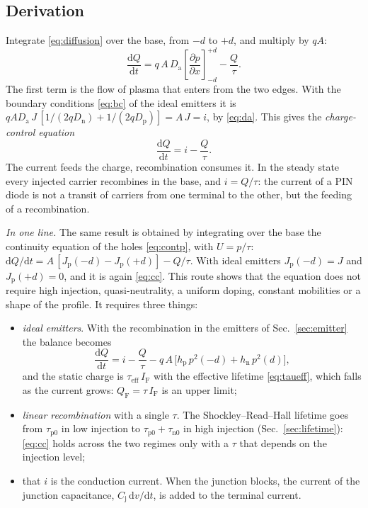 \documentclass[10pt,a4paper]{scrartcl}
\newcommand{\IF}{I_\mathrm{F}}
\newcommand{\Cj}{C_\mathrm{j}}
\newcommand{\diff}{\mathrm{d}}
\newcommand{\Da}{D_\mathrm{a}}
\newcommand{\Dn}{D_\mathrm{n}}
\newcommand{\Dp}{D_\mathrm{p}}
\newcommand{\Jp}{J_\mathrm{p}}
\newcommand{\QF}{Q_\mathrm{F}}
\newcommand{\dpar}[2]{\frac{\partial #1}{\partial #2}}
\begin{document}
\subsection{Derivation}
\label{sec:ccderiv}
Integrate \eqref{eq:diffusion} over the base, from $-d$ to $+d$, and multiply by $qA$:
\begin{equation}
\frac{\diff Q}{\diff t} = q\,A\,\Da\left[\dpar{p}{x}\right]_{-d}^{+d} - \frac{Q}{\tau} .
\label{eq:integrated}
\end{equation}
The first term is the flow of plasma that enters from the two edges. With the boundary conditions \eqref{eq:bc} of the ideal emitters it is $q A \Da\,J\,[1/(2q\Dn) + 1/(2q\Dp)] = A\,J = i$, by \eqref{eq:da}. This gives the \emph{charge-control equation}
\begin{equation}
\frac{\diff Q}{\diff t} = i - \frac{Q}{\tau} .
\label{eq:cc}
\end{equation}
The current feeds the charge, recombination consumes it. In the steady state every injected carrier recombines in the base, and $i = Q/\tau$: the current of a PIN diode is not a transit of carriers from one terminal to the other, but the feeding of a recombination.

\emph{In one line.} The same result is obtained by integrating over the base the continuity equation of the holes \eqref{eq:contp}, with $U = p/\tau$: $\diff Q/\diff t = A\,[\Jp(-d) - \Jp(+d)] - Q/\tau$. With ideal emitters $\Jp(-d) = J$ and $\Jp(+d) = 0$, and it is again \eqref{eq:cc}. This route shows that the equation does not require high injection, quasi-neutrality, a uniform doping, constant mobilities or a shape of the profile. It requires three things:
\begin{itemize}
\item \emph{ideal emitters}. With the recombination in the emitters of Sec.~\ref{sec:emitter} the balance becomes
\begin{equation}
\frac{\diff Q}{\diff t} = i - \frac{Q}{\tau} - q\,A\,\bigl[h_\mathrm{p}\,p^2(-d) + h_\mathrm{n}\,p^2(d)\bigr] ,
\label{eq:ccem}
\end{equation}
and the static charge is $\tau_\mathrm{eff}\,\IF$ with the effective lifetime \eqref{eq:taueff}, which falls as the current grows: $\QF = \tau\,\IF$ is an upper limit;
\item \emph{linear recombination} with a single $\tau$. The Shockley--Read--Hall lifetime goes from $\tau_\mathrm{p0}$ in low injection to $\tau_\mathrm{p0} + \tau_\mathrm{n0}$ in high injection (Sec.~\ref{sec:lifetime}): \eqref{eq:cc} holds across the two regimes only with a $\tau$ that depends on the injection level;
\item that $i$ is the conduction current. When the junction blocks, the current of the junction capacitance, $\Cj\,\diff v/\diff t$, is added to the terminal current.
\end{itemize}
\end{document}
